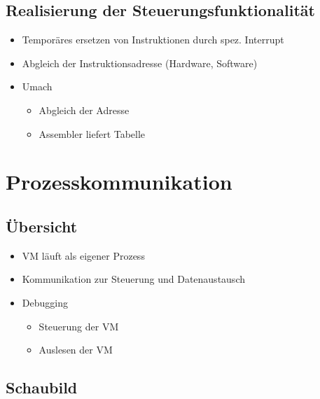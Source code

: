 \subsection{Realisierung der Steuerungsfunktionalität}

\begin{frame}{\insertsubsection}
    \begin{itemize}
         \item Temporäres ersetzen von Instruktionen durch spez. Interrupt
         \item Abgleich der Instruktionsadresse (Hardware, Software)
         \item Umach
         \begin{itemize}
             \item Abgleich der Adresse
             \item Assembler liefert Tabelle
         \end{itemize}     
    \end{itemize}
\end{frame}

\section{Prozesskommunikation}

\subsection{Übersicht}

\begin{frame}{\insertsubsection}
    \begin{itemize}
         \item VM läuft als eigener Prozess
         \item Kommunikation zur Steuerung und Datenaustausch
         \item Debugging
         \begin{itemize}
             \item Steuerung der VM
             \item Auslesen der VM
         \end{itemize}     
    \end{itemize}
\end{frame}

\subsection{Schaubild}

